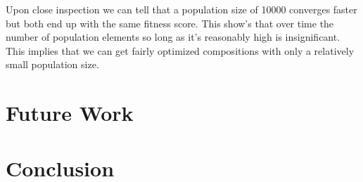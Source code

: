 \documentclass{article}
\begin{document}
Upon close inspection we can tell that a population size of 10000 converges faster but both end up with the same fitness score. This show's that over time the number of population elements so long as it's reasonably high is insignificant. This implies that we can get fairly optimized compositions with only a relatively small population size. 

\section{Future Work}

\section{Conclusion}



\end{document}
